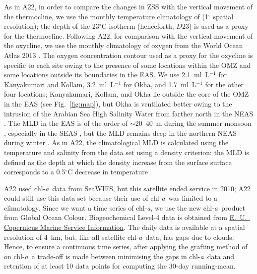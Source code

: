 \documentclass[authoryear,review,11pt]{elsarticle}
\newcommand{\chla}{chl-{\emph{a}}}
\begin{document}
As in A22, in order to compare the changes in ZSS with the vertical movement of the thermocline, we use the monthly temperature climatology of \citet{chatterjee2012new} (1$^{\circ}$ spatial resolution); the depth of the 23$^{\circ}$C isotherm (henceforth, $D23$) is used as a proxy for the thermocline. Following A22, for comparison with the vertical movement of the oxycline, we use the monthly climatology of oxygen from the World Ocean Atlas 2013 \citep{garcia2013oxygen}.  The oxygen concentration contour used as a proxy for the oxycline is specific to each site owing to the presence of some locations within the OMZ and some locations outside its boundaries in the EAS. We use 2.1~ml~L$^{-1}$ for Kanyakumari and Kollam, 3.2~ml~L$^{-1}$ for Okha, and 1.7~ml~L$^{-1}$ for the other four locations; Kanyakumari, Kollam, and Okha lie outside the core of the OMZ in the EAS (see Fig.~\ref{fig:map}), but Okha is ventilated better owing to the intrusion of the Arabian Sea High Salinity Water \citep[ASHSW;][]{rochford1964salinity, wyrtki1971oceanographic} from farther north in the NEAS \citep{banse2009wintertime, naqvi2006coastal, shankar2016inhibition}. The MLD in the EAS is of the order of $\sim$20--40~m during the summer monsoon \citep{shetye1990hydrography, shankar2002hydrography, sreenivas2008monthly}, especially in the SEAS \citep{shenoi2005hydrography}, but the MLD remains deep in the northern NEAS during winter \citep{shankar2016inhibition}. As in A22, the climatological MLD is calculated using the temperature and salinity from the \citet{chatterjee2012new} data set using a density criterion: the MLD is defined as the depth at which the density increase from the surface surface corresponds to a 0.5$^\circ$C decrease in temperature \citep{shenoi2004remote}. 

A22 used \chla\ data from SeaWIFS, but this satellite ended service in 2010; A22 could still use this data set because their use of \chla\ was limited to a climatology.  Since we want a time series of \chla, we use the new \chla\ product from Global Ocean Colour. Biogeochemical Level-4 data is obtained from \href{https://doi.org/10.48670/moi-00281}{E.~U.~ Copernicus Marine Service Information}. The daily data is available at a spatial resolution of 4~km, but, like all satellite \chla\ data, has gaps due to clouds. Hence, to ensure a continuous time series, after applying the grafting method of \citet{mukhopadhyay2017st} on \chla\, a trade-off is made between minimising the gaps in \chla\ data and retention of at least 10 data points for computing the 30-day running-mean.
\end{document}
